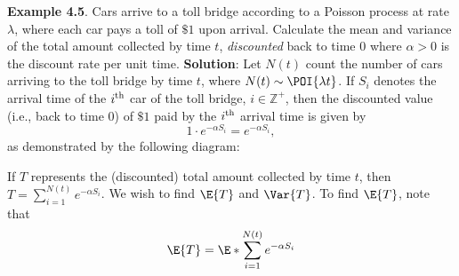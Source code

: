 \begin{Example}
    \textbf{Example 4.5}. Cars arrive to a toll bridge according to a Poisson process at rate $ \lambda $, where each
    car pays a toll of $\$1$ upon arrival. Calculate the mean and variance of the total amount
        collected by time $t$, \emph{discounted} back to time $0$ where $ \alpha>0 $ is the discount rate per unit time.
        \tcblower{}
        \textbf{Solution}: Let $ N(t) $ count the number of cars arriving to the toll
        bridge by time $ t $, where $ N(t) \sim \POI{\lambda t} $. If
    $ S_i $ denotes the arrival time of the $ i\textsuperscript{th} $
        car of the toll bridge, $ i\in\mathbb{Z}^+ $, then the discounted
        value (i.e., back to time $ 0 $) of $\$1$ paid by the $ i\textsuperscript{th} $
        arrival time is given by
        \[ 1\cdot e^{-\alpha S_i}=e^{-\alpha S_i}, \]
        as demonstrated by the following diagram:
        \begin{center}
        \end{center}
        If $ T $ represents the (discounted) total amount collected by time $ t $,
        then $ T=\sum_{i=1}^{N(t)}e^{-\alpha S_i} $. We wish to find
    $ \E{T} $ and $ \Var{T} $. To find $ \E{T} $, note that
        \begin{align*}
            \E{T}
             & =\E*{\sum_{i=1}^{N(t)}e^{-\alpha S_i}}                                                                                    \\

\end{align*}
\end{Example}
